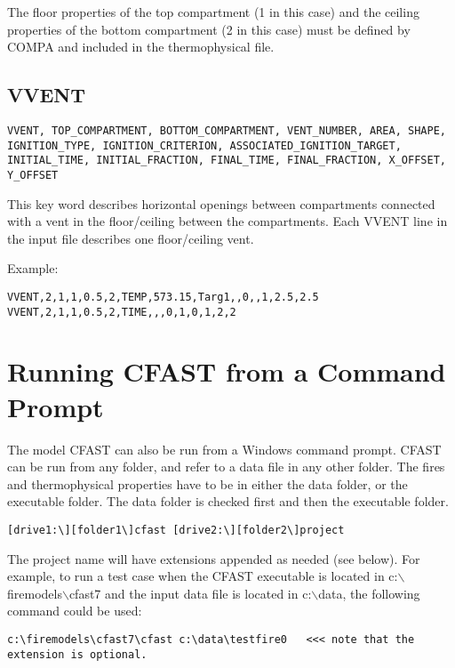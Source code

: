 The floor properties of the top compartment (1 in this case) and the ceiling properties of the bottom compartment (2 in this case) must be defined by COMPA and included in the thermophysical file.

\section{VVENT}

\begin{lstlisting}
VVENT, TOP_COMPARTMENT, BOTTOM_COMPARTMENT, VENT_NUMBER, AREA, SHAPE, IGNITION_TYPE, IGNITION_CRITERION, ASSOCIATED_IGNITION_TARGET, INITIAL_TIME, INITIAL_FRACTION, FINAL_TIME, FINAL_FRACTION, X_OFFSET, Y_OFFSET
\end{lstlisting}

This key word describes horizontal openings between compartments connected with a vent in the floor/ceiling between the compartments. Each VVENT line in the input file describes one floor/ceiling vent.  

Example:

\begin{lstlisting}
VVENT,2,1,1,0.5,2,TEMP,573.15,Targ1,,0,,1,2.5,2.5
VVENT,2,1,1,0.5,2,TIME,,,0,1,0,1,2,2
\end{lstlisting}



\chapter{Running CFAST from a Command Prompt}

The model CFAST can also be run from a Windows command prompt.  CFAST can be run from any folder, and refer to a data file in any other folder. The fires and thermophysical properties have to be in either the data folder, or the executable folder. The data folder is checked first and then the executable folder.

\begin{lstlisting}
[drive1:\][folder1\]cfast [drive2:\][folder2\]project
\end{lstlisting}

The project name will have extensions appended as needed (see below). For example, to run a test case when the CFAST executable is located in c:$\backslash$firemodels$\backslash$cfast7 and the input data file is located in c:$\backslash$data, the following command could be used:

\begin{lstlisting}
c:\firemodels\cfast7\cfast c:\data\testfire0   <<< note that the extension is optional.
\end{lstlisting}

